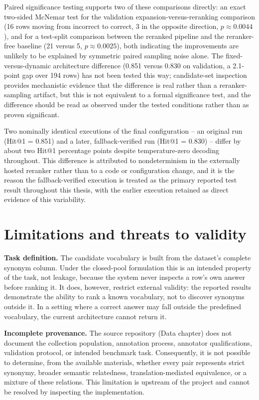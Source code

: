 Paired significance testing supports two of these comparisons directly: an exact two-sided McNemar test for the validation expansion-versus-reranking comparison (16 rows moving from incorrect to correct, 3 in the opposite direction, $p \approx 0.0044$), and for a test-split comparison between the reranked pipeline and the reranker-free baseline (21 versus 5, $p \approx 0.0025$), both indicating the improvements are unlikely to be explained by symmetric paired sampling noise alone. The fixed-versus-dynamic architecture difference (0.851 versus 0.830 on validation, a 2.1-point gap over 194 rows) has not been tested this way; candidate-set inspection provides mechanistic evidence that the difference is real rather than a reranker-sampling artifact, but this is not equivalent to a formal significance test, and the difference should be read as observed under the tested conditions rather than as proven significant.

Two nominally identical executions of the final configuration -- an original run (Hit@1 = 0.851) and a later, fallback-verified run (Hit@1 = 0.830) -- differ by about two Hit@1 percentage points despite temperature-zero decoding throughout. This difference is attributed to nondeterminism in the externally hosted reranker rather than to a code or configuration change, and it is the reason the fallback-verified execution is treated as the primary reported test result throughout this thesis, with the earlier execution retained as direct evidence of this variability.

\section{Limitations and threats to validity}
\label{sec:threats}
\label{sec:data-limitations}

\textbf{Task definition.} The candidate vocabulary is built from the dataset's complete synonym column. Under the closed-pool formulation this is an intended property of the task, not leakage, because the system never inspects a row's own answer before ranking it. It does, however, restrict external validity: the reported results demonstrate the ability to rank a known vocabulary, not to discover synonyms outside it. In a setting where a correct answer may fall outside the predefined vocabulary, the current architecture cannot return it.

\textbf{Incomplete provenance.} The source repository (Data chapter) does not document the collection population, annotation process, annotator qualifications, validation protocol, or intended benchmark task. Consequently, it is not possible to determine, from the available materials, whether every pair represents strict synonymy, broader semantic relatedness, translation-mediated equivalence, or a mixture of these relations. This limitation is upstream of the project and cannot be resolved by inspecting the implementation.


